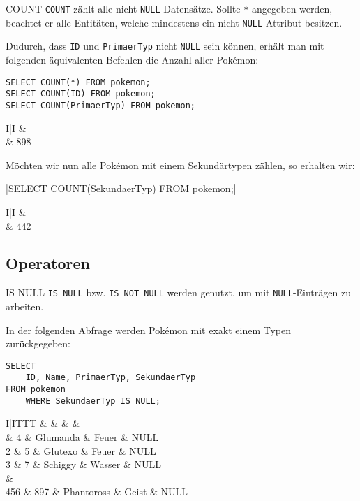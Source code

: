 \begin{sql}{COUNT}
    \texttt{COUNT} zählt alle nicht-\texttt{NULL} Datensätze.
    Sollte \texttt{*} angegeben werden, beachtet er alle Entitäten, welche mindestens ein nicht-\texttt{NULL} Attribut besitzen.

    Dudurch, dass \texttt{ID} und \texttt{PrimaerTyp} nicht \texttt{NULL} sein können, erhält man mit folgenden äquivalenten Befehlen die Anzahl aller Pokémon:

    \begin{verbatim}
SELECT COUNT(*) FROM pokemon;
SELECT COUNT(ID) FROM pokemon;
SELECT COUNT(PrimaerTyp) FROM pokemon;
    \end{verbatim}

    \begin{tabular}{I|I}
        &  \\ & 898 \\
    \end{tabular}

    Möchten wir nun alle Pokémon mit einem Sekundärtypen zählen, so erhalten wir: 

    |SELECT COUNT(SekundaerTyp) FROM pokemon;|

    \begin{tabular}{I|I}
        &  \\ & 442 \\
    \end{tabular}
\end{sql}

\subsection{Operatoren}

\begin{sql}{IS NULL}
    \texttt{IS NULL} bzw. \texttt{IS NOT NULL} werden genutzt, um mit \texttt{NULL}-Einträgen zu arbeiten.

    In der folgenden Abfrage werden Pokémon mit exakt einem Typen zurückgegeben:

    \begin{verbatim}
SELECT
    ID, Name, PrimaerTyp, SekundaerTyp
FROM pokemon
    WHERE SekundaerTyp IS NULL;
    \end{verbatim}

    \begin{tabular}{I|ITTT}
        &  &  &  &  \\ & 4 & Glumanda & Feuer & NULL \\
        2 & 5 & Glutexo & Feuer & NULL \\
        3 & 7 & Schiggy & Wasser & NULL \\
         &  \\
        456 & 897 & Phantoross & Geist & NULL \\
    \end{tabular}
\end{sql}

